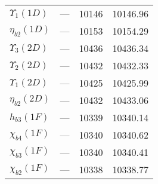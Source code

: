\begin{tabular}{lccc}
$\Upsilon_{1}(1D)$ &      — &  10146 &  10146.96 \\
$\eta_{b2}(1D)$    &      — &  10153 &  10154.29 \\
$\Upsilon_{3}(2D)$ &      — &  10436 &  10436.34 \\
$\Upsilon_{2}(2D)$ &      — &  10432 &  10432.33 \\
$\Upsilon_{1}(2D)$ &      — &  10425 &  10425.99 \\
$\eta_{b2}(2D)$    &      — &  10432 &  10433.06 \\
$h_{b3}(1F)$       &      — &  10339 &  10340.14 \\
$\chi_{b4}(1F)$    &      — &  10340 &  10340.62 \\
$\chi_{b3}(1F)$    &      — &  10340 &  10340.41 \\
$\chi_{b2}(1F)$    &      — &  10338 &  10338.77 \\
\bottomrule
\end{tabular}
